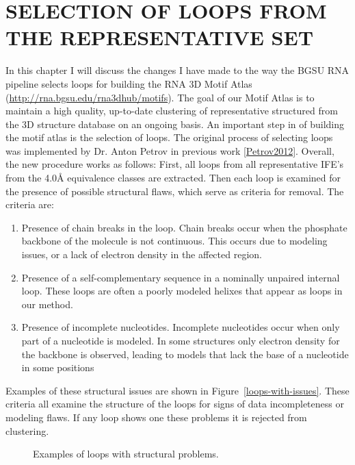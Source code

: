 \chapter{SELECTION OF LOOPS FROM THE REPRESENTATIVE SET}

In this chapter I will discuss the changes I have made to the way the BGSU RNA
pipeline selects loops for building the RNA 3D Motif Atlas
(\url{http://rna.bgsu.edu/rna3dhub/motifs}). The goal of our Motif Atlas is to
maintain a high quality, up-to-date clustering of representative structured from
the 3D structure database on an ongoing basis. An important step in of building
the motif atlas is the selection of loops. The original process of selecting
loops was implemented by Dr. Anton Petrov in previous work \ref{Petrov2012}.
Overall, the new procedure works as follows: First, all loops from all
representative IFE’s from the 4.0{\AA} equivalence classes are extracted. Then each
loop is examined for the presence of possible structural flaws, which serve as
criteria for removal. The criteria are: 

\begin{enumerate}
  \item Presence of chain breaks in the loop. Chain breaks occur when the
    phosphate backbone of the molecule is not continuous. This occurs due to
    modeling issues, or a lack of electron density in the affected region.

  \item Presence of a self-complementary sequence in a nominally unpaired
    internal loop. These loops are often a poorly modeled helixes that appear as
    loops in our method.

  \item Presence of incomplete nucleotides. Incomplete nucleotides occur when
    only part of a nucleotide is modeled. In some structures only electron
    density for the backbone is observed, leading to models that lack the base
    of a nucleotide in some positions
\end{enumerate}

Examples of these structural issues are shown in Figure~\ref{loops-with-issues}.
These criteria all examine the structure of the loops for signs of data
incompleteness or modeling flaws. If any loop shows one these problems it is
rejected from clustering. 

\begin{figure}
  \caption{Examples of loops with structural problems.}
  \label{fig:loops-with-issues}
\end{figure}

